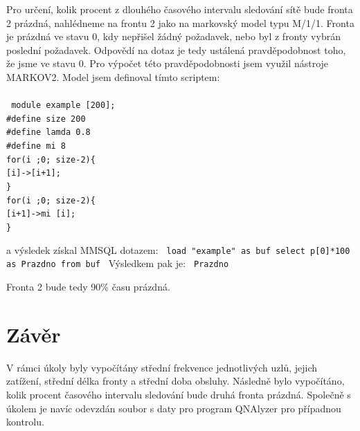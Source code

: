\documentclass{article}
\begin{document}
Pro určení, kolik procent z dlouhého časového intervalu sledování sítě bude fronta 2 prázdná, nahlédneme na frontu 2 jako na markovský model typu M/1/1.
Fronta je prázdná ve stavu 0, kdy nepřišel žádný požadavek, nebo byl z fronty vybrán poslední požadavek. 
Odpovědí na dotaz je tedy ustálená pravděpodobnost toho, že jsme ve stavu 0.
Pro výpočet této pravděpodobnosti jsem využil nástroje MARKOV2. Model jsem definoval tímto scriptem:\\
\\
\newline
\texttt
{
module example [200];\\
\#define size 200\\
\#define lamda 0.8\\
\#define mi 8\\
\newline
for(i ;0; size-2)\{\\
	{[}i{]}->{[i+1]};\\
\}\\
\newline
for(i ;0; size-2)\{\\
	{[}i+1{]}->mi {[i]};\\
\}\\
}

a výsledek získal MMSQL dotazem:\newline
\newline
\texttt
{
load "example" as buf\newline
select p{[0]}*100 \newline
as Prazdno from buf\newline
}
\newline
Výsledkem pak je:
\texttt
\newline
\texttt{
Prazdno 
}

Fronta 2 bude tedy 90\% času prázdná.

\section{Závěr} %
V rámci úkoly byly vypočítány střední frekvence jednotlivých uzlů, jejich zatížení, střední délka fronty a střední doba obsluhy. Následně bylo vypočítáno, kolik procent časového intervalu sledování bude druhá fronta prázdná. Společně s úkolem je navíc odevzdán soubor s daty pro program QNAlyzer pro případnou kontrolu.
\end{document}
